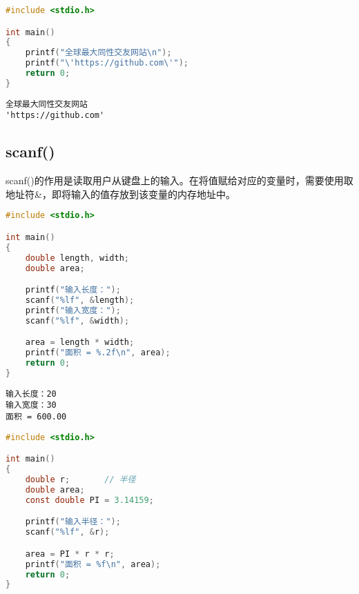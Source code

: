 
\begin{lstlisting}[language=C]
#include <stdio.h>

int main()
{
	printf("全球最大同性交友网站\n");
	printf("\'https://github.com\'");
	return 0;
}
\end{lstlisting}

\begin{tcolorbox}
	\begin{verbatim}
全球最大同性交友网站
'https://github.com'
	\end{verbatim}
\end{tcolorbox}

\vspace{0.5cm}

\subsection{scanf()}

scanf()的作用是读取用户从键盘上的输入。在将值赋给对应的变量时，需要使用取地址符\&，即将输入的值存放到该变量的内存地址中。\\


\begin{lstlisting}[language=C]
#include <stdio.h>

int main()
{
	double length, width;
	double area;

	printf("输入长度：");
	scanf("%lf", &length);
	printf("输入宽度：");
	scanf("%lf", &width);

	area = length * width;
	printf("面积 = %.2f\n", area);
	return 0;
}
\end{lstlisting}

\begin{tcolorbox}
	\begin{verbatim}
输入长度：20
输入宽度：30
面积 = 600.00
	\end{verbatim}
\end{tcolorbox}

\vspace{0.5cm}


\begin{lstlisting}[language=C]
#include <stdio.h>

int main()
{
	double r;       // 半径
	double area;
	const double PI = 3.14159;

	printf("输入半径：");
	scanf("%lf", &r);

	area = PI * r * r;
	printf("面积 = %f\n", area);
	return 0;
}
\end{lstlisting}


